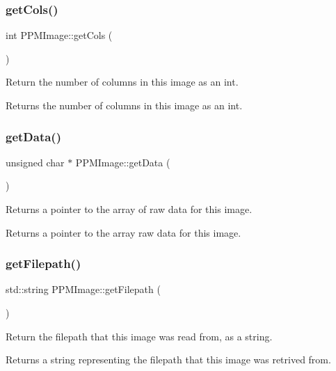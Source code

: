 \subsubsection{\texorpdfstring{get\+Cols()}{getCols()}}
{\footnotesize\ttfamily int P\+P\+M\+Image\+::get\+Cols (\begin{DoxyParamCaption}{ }\end{DoxyParamCaption})}

Return the number of columns in this image as an int.

\begin{DoxyReturn}{Returns}
the number of columns in this image as an int. 
\end{DoxyReturn}
\mbox{\label{classPPMImage_a6251e11a3e63d587526c04a4d67018a8}} 
\subsubsection{\texorpdfstring{get\+Data()}{getData()}}
{\footnotesize\ttfamily unsigned char $\ast$ P\+P\+M\+Image\+::get\+Data (\begin{DoxyParamCaption}{ }\end{DoxyParamCaption})}

Returns a pointer to the array of raw data for this image.

\begin{DoxyReturn}{Returns}
a pointer to the array raw data for this image. 
\end{DoxyReturn}
\mbox{\label{classPPMImage_ac1c531367f7b41d60e527d10f77f7536}} 
\subsubsection{\texorpdfstring{get\+Filepath()}{getFilepath()}}
{\footnotesize\ttfamily std\+::string P\+P\+M\+Image\+::get\+Filepath (\begin{DoxyParamCaption}{ }\end{DoxyParamCaption})}

Return the filepath that this image was read from, as a string.

\begin{DoxyReturn}{Returns}
a string representing the filepath that this image was retrived from. 
\end{DoxyReturn}
\mbox{\label{classPPMImage_aa4fc6f6e7eb6fc7304c214b75b8eb80e}} 
